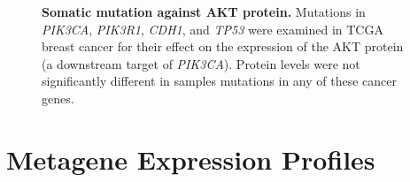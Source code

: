 \begin{figure}[!ht]
\begin{center}
    \end{center}
    \caption[Somatic mutation against AKT protein]{\small \textbf{Somatic mutation against AKT protein.} Mutations in \textit{PIK3CA}, \textit{PIK3R1}, \textit{CDH1}, and \textit{TP53} were examined in TCGA breast cancer for their effect on the expression of the AKT protein (a downstream target of \textit{PIK3CA}). Protein levels were not significantly different in samples mutations in any of these cancer genes.
}
\label{fig:mutation_expr_prot2}
\end{figure}

\chapter{Metagene Expression Profiles}
\label{appendix:mg_expr_SL}


